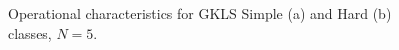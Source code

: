 \documentclass[runningheads]{llncs}
\begin{document}
\begin{figure}
\begin{minipage}{0.5\linewidth}
\end{minipage}
\hfill
\begin{minipage}{0.5\linewidth}
\end{minipage}
\caption{Operational characteristics for GKLS Simple (a) and Hard (b) classes, $N=5$.}
\label{oper5}
\end{figure}
\end{document}

